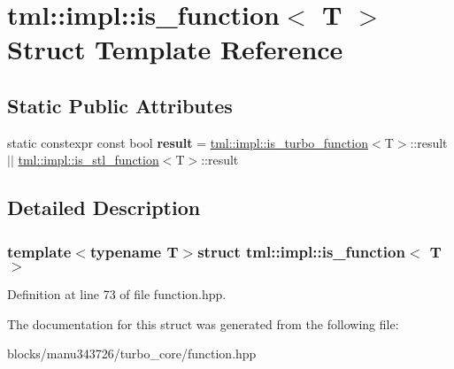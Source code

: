 \hypertarget{structtml_1_1impl_1_1is__function}{\section{tml\+:\+:impl\+:\+:is\+\_\+function$<$ T $>$ Struct Template Reference}
\label{structtml_1_1impl_1_1is__function}
}
\subsection*{Static Public Attributes}
\begin{DoxyCompactItemize}
\item 
\hypertarget{structtml_1_1impl_1_1is__function_ae9ff0be72147ff1540ef9d5b67875c39}{static constexpr const bool {\bfseries result} = \hyperlink{structtml_1_1impl_1_1is__turbo__function}{tml\+::impl\+::is\+\_\+turbo\+\_\+function}$<$T$>$\+::result $\vert$$\vert$ \hyperlink{structtml_1_1impl_1_1is__stl__function}{tml\+::impl\+::is\+\_\+stl\+\_\+function}$<$T$>$\+::result}\label{structtml_1_1impl_1_1is__function_ae9ff0be72147ff1540ef9d5b67875c39}

\end{DoxyCompactItemize}


\subsection{Detailed Description}
\subsubsection*{template$<$typename T$>$struct tml\+::impl\+::is\+\_\+function$<$ T $>$}



Definition at line 73 of file function.\+hpp.



The documentation for this struct was generated from the following file\+:\begin{DoxyCompactItemize}
\item 
blocks/manu343726/turbo\+\_\+core/function.\+hpp\end{DoxyCompactItemize}
